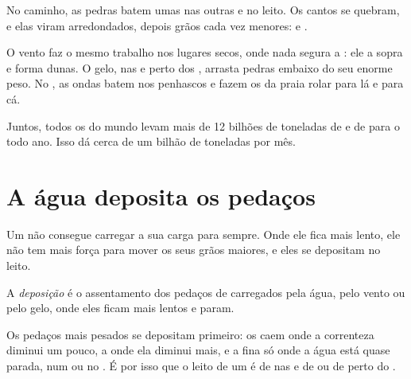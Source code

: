 No caminho, as pedras batem umas nas outras e no leito. Os cantos se
quebram, e elas viram  arredondados, depois grãos cada vez menores:
 e .

O vento faz o mesmo trabalho nos lugares secos, onde nada segura a :
ele a sopra e forma dunas. O gelo, nas  e perto dos , arrasta
pedras embaixo do seu enorme peso. No , as ondas batem nos
penhascos e fazem os  da praia rolar para lá e para cá.

\begin{remark}[Quanto?]\label{rem:g5:water-shapes-the-land:how-much}
Juntos, todos os  do mundo levam mais de 12 bilhões de toneladas de
 e de  para o  todo ano. Isso dá cerca de um bilhão de
toneladas por mês.
\end{remark}

\section{A água deposita os pedaços}

Um  não consegue carregar a sua carga para sempre. Onde ele fica mais
lento, ele não tem mais força para mover os seus grãos maiores, e eles se
depositam no leito.

\begin{definition}[Deposição]\label{def:g5:water-shapes-the-land:deposition}
A \emph{deposição} é o assentamento dos pedaços de 
carregados pela água, pelo vento ou pelo gelo, onde eles ficam mais lentos e param.
\end{definition}

Os pedaços mais pesados se depositam primeiro: os  caem onde a
correnteza diminui um pouco, a  onde ela diminui mais, e a  fina
só onde a água está quase parada, num  ou no . É por isso que o
leito de um  é de  nas  e de  ou de  perto do .

